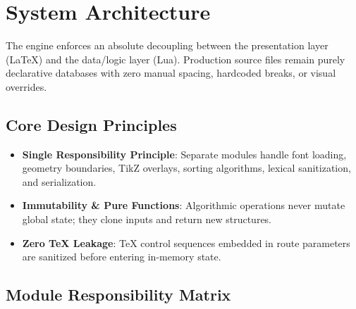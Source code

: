 \section{System Architecture}

The engine enforces an absolute decoupling between the presentation layer (\LaTeX) and the data/logic layer (Lua). Production source files remain purely declarative databases with zero manual spacing, hardcoded breaks, or visual overrides.

\subsection{Core Design Principles}
\begin{itemize}
    \item \textbf{Single Responsibility Principle}: Separate modules handle font loading, geometry boundaries, TikZ overlays, sorting algorithms, lexical sanitization, and serialization.
    \item \textbf{Immutability \& Pure Functions}: Algorithmic operations never mutate global state; they clone inputs and return new structures.
    \item \textbf{Zero TeX Leakage}: TeX control sequences embedded in route parameters are sanitized before entering in-memory state.
\end{itemize}

\subsection{Module Responsibility Matrix}


